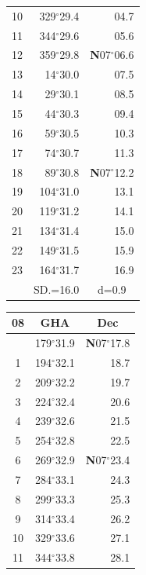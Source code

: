 \documentclass[10pt, a4paper]{report}
\begin{document}
\begin{scriptsize}
\begin{tabular*}{0.2\textwidth}[t]{@{\extracolsep{\fill}}|c|rr|}
10 & 329$^\circ$29.4 & 04.7\\
11 & 344$^\circ$29.6 & 05.6\\[2Pt]
12 & 359$^\circ$29.8 & \textbf{N}07$^\circ$06.6\\
13 & 14$^\circ$30.0 & 07.5\\
14 & 29$^\circ$30.1 & 08.5\\
15 & 44$^\circ$30.3 & \raisebox{0.24ex}{\boldmath$\cdot$~\boldmath$\cdot$~~}09.4\\
16 & 59$^\circ$30.5 & 10.3\\
17 & 74$^\circ$30.7 & 11.3\\[2Pt]
18 & 89$^\circ$30.8 & \textbf{N}07$^\circ$12.2\\
19 & 104$^\circ$31.0 & 13.1\\
20 & 119$^\circ$31.2 & 14.1\\
21 & 134$^\circ$31.4 & \raisebox{0.24ex}{\boldmath$\cdot$~\boldmath$\cdot$~~}15.0\\
22 & 149$^\circ$31.5 & 15.9\\
23 & 164$^\circ$31.7 & 16.9\\
\hline
\rule{0pt}{2.4ex} & \multicolumn{1}{c}{SD.=16.0} & \multicolumn{1}{c|}{d=0.9}\\
\hline
\end{tabular*}\noindent
\begin{tabular*}{0.2\textwidth}[t]{@{\extracolsep{\fill}}|c|rr|}
\hline
\multicolumn{1}{|c|}{\rule{0pt}{2.6ex}\textbf{08}} & \multicolumn{1}{c}{\textbf{GHA}} & \multicolumn{1}{c|}{\textbf{Dec}}\\
\hline\rule{0pt}{2.6ex}\noindent
0 & 179$^\circ$31.9 & \textbf{N}07$^\circ$17.8\\
1 & 194$^\circ$32.1 & 18.7\\
2 & 209$^\circ$32.2 & 19.7\\
3 & 224$^\circ$32.4 & \raisebox{0.24ex}{\boldmath$\cdot$~\boldmath$\cdot$~~}20.6\\
4 & 239$^\circ$32.6 & 21.5\\
5 & 254$^\circ$32.8 & 22.5\\[2Pt]
6 & 269$^\circ$32.9 & \textbf{N}07$^\circ$23.4\\
7 & 284$^\circ$33.1 & 24.3\\
8 & 299$^\circ$33.3 & 25.3\\
9 & 314$^\circ$33.4 & \raisebox{0.24ex}{\boldmath$\cdot$~\boldmath$\cdot$~~}26.2\\
10 & 329$^\circ$33.6 & 27.1\\
11 & 344$^\circ$33.8 & 28.1\\[2Pt]

\end{tabular*}
\end{scriptsize}
\end{document}
